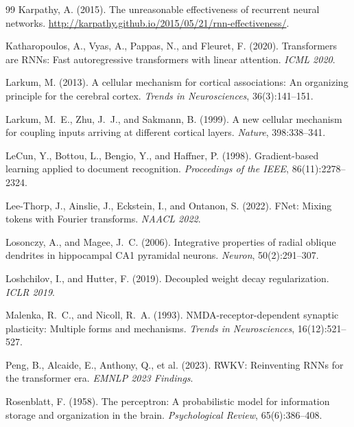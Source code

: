 \documentclass[11pt,a4paper]{article}
\begin{document}
\begin{thebibliography}{99}
Karpathy, A. (2015).
The unreasonable effectiveness of recurrent neural networks.
\url{http://karpathy.github.io/2015/05/21/rnn-effectiveness/}.

Katharopoulos, A., Vyas, A., Pappas, N., and Fleuret, F. (2020).
Transformers are RNNs: Fast autoregressive transformers with
linear attention.
\textit{ICML 2020}.

Larkum, M. (2013).
A cellular mechanism for cortical associations: An organizing
principle for the cerebral cortex.
\textit{Trends in Neurosciences}, 36(3):141--151.

Larkum, M.~E., Zhu, J.~J., and Sakmann, B. (1999).
A new cellular mechanism for coupling inputs arriving at different
cortical layers.
\textit{Nature}, 398:338--341.

LeCun, Y., Bottou, L., Bengio, Y., and Haffner, P. (1998).
Gradient-based learning applied to document recognition.
\textit{Proceedings of the IEEE}, 86(11):2278--2324.

Lee-Thorp, J., Ainslie, J., Eckstein, I., and Ontanon, S. (2022).
FNet: Mixing tokens with Fourier transforms.
\textit{NAACL 2022}.

Losonczy, A., and Magee, J.~C. (2006).
Integrative properties of radial oblique dendrites in hippocampal
CA1 pyramidal neurons.
\textit{Neuron}, 50(2):291--307.

Loshchilov, I., and Hutter, F. (2019).
Decoupled weight decay regularization.
\textit{ICLR 2019}.

Malenka, R.~C., and Nicoll, R.~A. (1993).
NMDA-receptor-dependent synaptic plasticity:
Multiple forms and mechanisms.
\textit{Trends in Neurosciences}, 16(12):521--527.

Peng, B., Alcaide, E., Anthony, Q., et al. (2023).
RWKV: Reinventing RNNs for the transformer era.
\textit{EMNLP 2023 Findings}.

Rosenblatt, F. (1958).
The perceptron: A probabilistic model for information storage and
organization in the brain.
\textit{Psychological Review}, 65(6):386--408.


\end{thebibliography}
\end{document}
